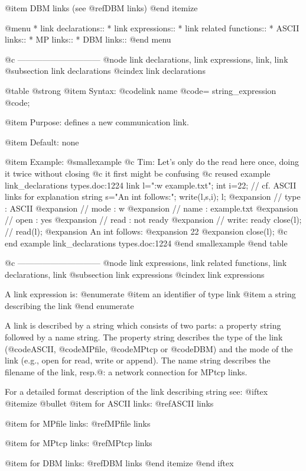 {{{{{{@item DBM links (see
@ref{DBM links})
@end itemize

@menu
* link declarations::
* link expressions::
* link related functions::
* ASCII links::
* MP links::
* DBM links::
@end menu

@c ------------------------------
@node link declarations, link expressions, link, link
@subsection link declarations
@cindex link declarations

@table @strong
@item Syntax:
@code{link} name @code{=} string_expression @code{;}

@item Purpose:
defines a new communication link.

@item Default:
none

@item Example:
@smallexample
@c Tim: Let's only do the read here once, doing it twice without closing
@c it first might be confusing
@c reused example link_declarations types.doc:1224 
  link l=":w example.txt";
  int i=22;          // cf. ASCII links for explanation
  string s="An int follows:";
  write(l,s,i);
  l;
@expansion{} // type : ASCII
@expansion{} // mode : w
@expansion{} // name : example.txt
@expansion{} // open : yes
@expansion{} // read : not ready
@expansion{} // write: ready
  close(l);          //
  read(l);
@expansion{} An int follows:
@expansion{} 22
@expansion{} 
  close(l);
@c end example link_declarations types.doc:1224
@end smallexample
@end table

@c ------------------------------
@node link expressions, link related functions, link declarations, link
@subsection link expressions
@cindex link expressions

A link expression is:
@enumerate
@item
an identifier of type link
@item
a string describing the link
@end enumerate

A link is described by a string which consists of two parts: a property
string followed by a name string. The property string describes the type
of the link (@code{ASCII}, @code{MPfile}, @code{MPtcp} or @code{DBM})
and the mode of the link (e.g., open for read, write or append). The name
string describes the filename of the link, resp.@: a network connection
for MPtcp links.

For a detailed format description of the link describing string see:
@iftex
@itemize @bullet
@item for ASCII links:
@ref{ASCII links}

@item for MPfile links:
@ref{MPfile links}

@item for MPtcp links:
@ref{MPtcp links}

@item for DBM links:
@ref{DBM links}
@end itemize
@end iftex

}}}}}}
